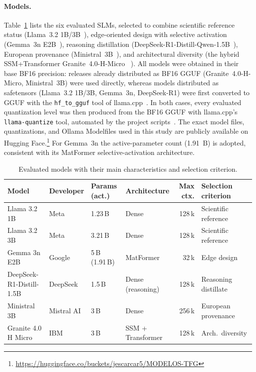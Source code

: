 \documentclass[acmsmall,natbib=false]{acmart}
\begin{document}
\paragraph{Models.}
Table~\ref{tab:models} lists the six evaluated SLMs, selected to combine
scientific reference status (Llama~3.2 1B/3B~\cite{Llama32_1B_Instruct,
Llama32_3B_Instruct}), edge-oriented design with selective activation
(Gemma~3n E2B~\cite{Gemma3nE2B}), reasoning distillation
(DeepSeek-R1-Distill-Qwen-1.5B~\cite{DeepSeekR1DistillQwen15B}), European
provenance (Ministral~3B~\cite{Ministral33BInstruct2512GGUF}), and
architectural diversity (the hybrid SSM+Transformer Granite~4.0-H-Micro
~\cite{Granite4HMicroGGUF}). All models were obtained in their base BF16
precision: releases already distributed as BF16 GGUF (Granite~4.0-H-Micro,
Ministral~3B) were used directly, whereas models distributed as safetensors
(Llama~3.2 1B/3B, Gemma~3n, DeepSeek-R1) were first converted to GGUF with
the \texttt{hf\_to\_gguf} tool of llama.cpp~\cite{gerganov_llamacpp_2023}. In
both cases, every evaluated quantization level was then produced from the
BF16 GGUF with llama.cpp's \texttt{llama-quantize} tool, automated by the
project scripts~\cite{carrascosa_carro_tfg-yisusccscripts_2026}. The exact
model files, quantizations, and Ollama Modelfiles used in this study are
publicly available on Hugging
Face.\footnote{\url{https://huggingface.co/buckets/jescarcar5/MODELOS-TFG}}
For Gemma~3n the active-parameter count (1.91~B) is adopted, consistent with
its MatFormer selective-activation architecture.

\begin{table}[t]
\centering
\caption{Evaluated models with their main characteristics and selection
criterion.}
\label{tab:models}
\footnotesize
\setlength{\tabcolsep}{3.5pt}
\begin{tabular}{l l l l r l}
\toprule
\textbf{Model} & \textbf{Developer} & \textbf{Params (act.)} &
\textbf{Architecture} & \textbf{Max ctx.} & \textbf{Selection criterion} \\
\midrule
Llama 3.2 1B & Meta & 1.23\,B & Dense & 128\,k & Scientific reference \\
Llama 3.2 3B & Meta & 3.21\,B & Dense & 128\,k & Scientific reference \\
Gemma 3n E2B & Google & 5\,B (1.91\,B) & MatFormer & 32\,k & Edge design \\
DeepSeek-R1-Distill-1.5B & DeepSeek & 1.5\,B & Dense (reasoning) & 128\,k & Reasoning distillate \\
Ministral 3B & Mistral AI & 3\,B & Dense & 256\,k & European provenance \\
Granite 4.0 H Micro & IBM & 3\,B & SSM + Transformer & 128\,k & Arch.\ diversity \\
\bottomrule
\end{tabular}
\end{table}
\end{document}
